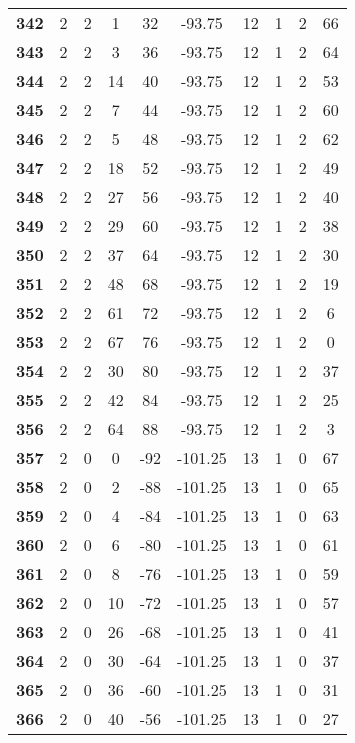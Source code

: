 \documentclass[12pt,letterpaper, onecolumn]{exam}
\begin{document}
\begin{longtable}{cccccccccc}
    \textbf{342} & 2 & 2 & 1 & 32 & -93.75 & 12 & 1 & 2 & 66 \\ 
    \textbf{343} & 2 & 2 & 3 & 36 & -93.75 & 12 & 1 & 2 & 64 \\ 
    \textbf{344} & 2 & 2 & 14 & 40 & -93.75 & 12 & 1 & 2 & 53 \\ 
    \textbf{345} & 2 & 2 & 7 & 44 & -93.75 & 12 & 1 & 2 & 60 \\ 
    \textbf{346} & 2 & 2 & 5 & 48 & -93.75 & 12 & 1 & 2 & 62 \\ 
    \textbf{347} & 2 & 2 & 18 & 52 & -93.75 & 12 & 1 & 2 & 49 \\ 
    \textbf{348} & 2 & 2 & 27 & 56 & -93.75 & 12 & 1 & 2 & 40 \\ 
    \textbf{349} & 2 & 2 & 29 & 60 & -93.75 & 12 & 1 & 2 & 38 \\ 
    \textbf{350} & 2 & 2 & 37 & 64 & -93.75 & 12 & 1 & 2 & 30 \\ 
    \textbf{351} & 2 & 2 & 48 & 68 & -93.75 & 12 & 1 & 2 & 19 \\ 
    \textbf{352} & 2 & 2 & 61 & 72 & -93.75 & 12 & 1 & 2 & 6 \\ 
    \textbf{353} & 2 & 2 & 67 & 76 & -93.75 & 12 & 1 & 2 & 0 \\ 
    \textbf{354} & 2 & 2 & 30 & 80 & -93.75 & 12 & 1 & 2 & 37 \\ 
    \textbf{355} & 2 & 2 & 42 & 84 & -93.75 & 12 & 1 & 2 & 25 \\ 
    \textbf{356} & 2 & 2 & 64 & 88 & -93.75 & 12 & 1 & 2 & 3 \\ 
    \textbf{357} & 2 & 0 & 0 & -92 & -101.25 & 13 & 1 & 0 & 67 \\ 
    \textbf{358} & 2 & 0 & 2 & -88 & -101.25 & 13 & 1 & 0 & 65 \\ 
    \textbf{359} & 2 & 0 & 4 & -84 & -101.25 & 13 & 1 & 0 & 63 \\ 
    \textbf{360} & 2 & 0 & 6 & -80 & -101.25 & 13 & 1 & 0 & 61 \\      \hline
    \textbf{361} & 2 & 0 & 8 & -76 & -101.25 & 13 & 1 & 0 & 59 \\ 
    \textbf{362} & 2 & 0 & 10 & -72 & -101.25 & 13 & 1 & 0 & 57 \\ 
    \textbf{363} & 2 & 0 & 26 & -68 & -101.25 & 13 & 1 & 0 & 41 \\ 
    \textbf{364} & 2 & 0 & 30 & -64 & -101.25 & 13 & 1 & 0 & 37 \\ 
    \textbf{365} & 2 & 0 & 36 & -60 & -101.25 & 13 & 1 & 0 & 31 \\ 
    \textbf{366} & 2 & 0 & 40 & -56 & -101.25 & 13 & 1 & 0 & 27 \\ 

\end{longtable}
\end{document}
